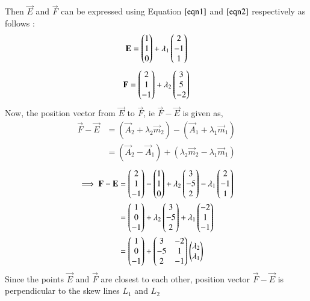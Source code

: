 \documentclass[journal,12pt,twocolumn]{IEEEtran}
\begin{document}
Then $\vec{E}$ and $\vec{F}$ can be expressed using Equation $\ref{eqn1}$ and $\ref{eqn2}$ respectively as follows :
\begin{align}
    \mathbf{E} = \begin{pmatrix}1 \\ 1 \\ 0\end{pmatrix} + \lambda_1\begin{pmatrix}2 \\ -1 \\ 1\end{pmatrix}
\end{align}
\begin{align}
    \mathbf{F} = \begin{pmatrix}2 \\ 1 \\ -1\end{pmatrix} + \lambda_2\begin{pmatrix}3 \\ 5 \\ -2\end{pmatrix}
\end{align}
Now, the position vector from $\vec{E}$ to $\vec{F}$, ie $\vec{F}-\vec{E}$ is given as,
\begin{align}
    \vec{F}-\vec{E} & = (\vec{A}_2 + \lambda_2\vec{m}_2) - (\vec{A}_1 + \lambda_1\vec{m}_1)\\& = (\vec{A}_2 - \vec{A}_1) + (\lambda_2\vec{m}_2 - \lambda_1\vec{m}_1)
\end{align}
\begin{align}
    \implies\mathbf{F}-\mathbf{E} & = \begin{pmatrix}2 \\ 1 \\ -1\end{pmatrix}-\begin{pmatrix}1 \\ 1 \\ 0\end{pmatrix} + \lambda_2\begin{pmatrix}3 \\ -5 \\ 2\end{pmatrix} -\lambda_1\begin{pmatrix}2\\-1\\1\end{pmatrix}\\&=\begin{pmatrix}1\\ 0 \\ -1\end{pmatrix}+ \lambda_2\begin{pmatrix}3 \\ -5 \\ 2\end{pmatrix} +\lambda_1\begin{pmatrix}-2\\1\\-1\end{pmatrix}\\& = \label{e4} \begin{pmatrix}1\\ 0 \\ -1\end{pmatrix}+\begin{pmatrix}3&-2\\-5&1\\2&-1\end{pmatrix}\begin{pmatrix}\lambda_2 \\ \lambda_1\end{pmatrix} 
\end{align}
Since the points $\vec{E}$ and $\vec{F}$ are closest to each other, position vector $\vec{F}-\vec{E}$ is perpendicular to the skew lines $L_1$ and $L_2$
\end{document}
